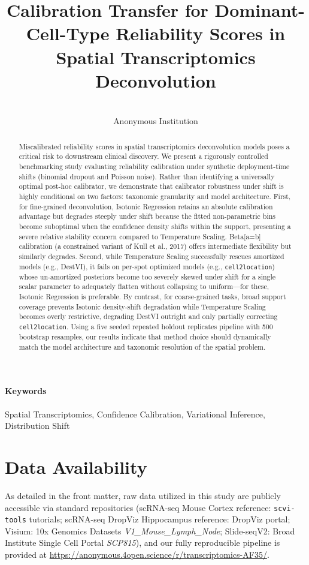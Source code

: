 \documentclass{jmlr} %
\title{Calibration Transfer for Dominant-Cell-Type Reliability Scores in Spatial Transcriptomics Deconvolution}
\author{\Name{Anonymous Authors} \Email{anonymous@example.com} \\
      \addr Anonymous Institution}
\begin{document}
\maketitle

\begin{abstract}
Miscalibrated reliability scores in spatial transcriptomics deconvolution models poses a critical risk to downstream clinical discovery. We present a rigorously controlled benchmarking study evaluating reliability calibration under synthetic deployment-time shifts (binomial dropout and Poisson noise). Rather than identifying a universally optimal post-hoc calibrator, we demonstrate that calibrator robustness under shift is highly conditional on two factors: taxonomic granularity and model architecture. First, for fine-grained deconvolution, Isotonic Regression retains an absolute calibration advantage but degrades steeply under shift because the fitted non-parametric bins become suboptimal when the confidence density shifts within the support, presenting a severe relative stability concern compared to Temperature Scaling. Beta[a=b] calibration (a constrained variant of Kull et al., 2017) offers intermediate flexibility but similarly degrades. Second, while Temperature Scaling successfully rescues amortized models (e.g., DestVI), it fails on per-spot optimized models (e.g., \texttt{cell2location}) whose un-amortized posteriors become too severely skewed under shift for a single scalar parameter to adequately flatten without collapsing to uniform---for these, Isotonic Regression is preferable. By contrast, for coarse-grained tasks, broad support coverage prevents Isotonic density-shift degradation while Temperature Scaling becomes overly restrictive, degrading DestVI outright and only partially correcting \texttt{cell2location}. Using a five seeded repeated holdout replicates pipeline with 500 bootstrap resamples, our results indicate that method choice should dynamically match the model architecture and taxonomic resolution of the spatial problem.
\end{abstract}

\paragraph*{Keywords}
Spatial Transcriptomics, Confidence Calibration, Variational Inference, Distribution Shift

\section{Data Availability}
As detailed in the front matter, raw data utilized in this study are publicly accessible via standard repositories (scRNA-seq Mouse Cortex reference: \texttt{scvi-tools} tutorials; scRNA-seq DropViz Hippocampus reference: DropViz portal; Visium: 10x Genomics Datasets \textit{V1\_Mouse\_Lymph\_Node}; Slide-seqV2: Broad Institute Single Cell Portal \textit{SCP815}), and our fully reproducible pipeline is provided at \url{https://anonymous.4open.science/r/transcriptomics-AF35/}.
\end{document}
